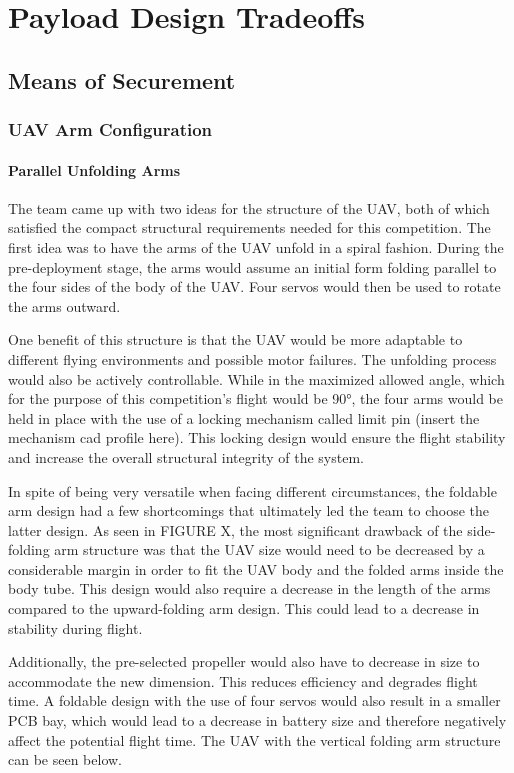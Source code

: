 \chapter{Payload Design Tradeoffs}

\section{Means of Securement}\label{PL:Tradeoffs:Securement}	
	\subsection{UAV Arm Configuration}
		\subsubsection{Parallel Unfolding Arms}
			The team came up with two ideas for the structure of the UAV, both of which satisfied the compact structural requirements needed for this competition. The first idea was to have the arms of the UAV unfold in a spiral fashion. During the pre-deployment stage, the arms would assume an initial form folding parallel to the four sides of the body of the UAV. Four servos would then be used to rotate the arms outward. 
		
			One benefit of this structure is that the UAV would be more adaptable to different flying environments and possible motor failures. The unfolding process would also be actively controllable. While in the maximized allowed angle, which for the purpose of this competition’s flight would be 90°, the four arms would be held in place with the use of a locking mechanism called limit pin (insert the mechanism cad profile here). This locking design would ensure the flight stability and increase the overall structural integrity of the system. 

			In spite of being very versatile when facing different circumstances, the foldable arm design had a few shortcomings that ultimately led the team to choose the latter design. As seen in FIGURE X, the most significant drawback of the side-folding arm structure was that the UAV size would need to be decreased by a considerable margin in order to fit the UAV body and the folded arms inside the body tube. This design would also require a decrease in the length of the arms compared to the upward-folding arm design. This could lead to a decrease in stability during flight. 
		
			Additionally, the pre-selected propeller would also have to decrease in size to accommodate the new dimension. This reduces efficiency and degrades flight time. A foldable design with the use of four servos would also result in a smaller PCB bay, which would lead to a decrease in battery size and therefore negatively affect the potential flight time. The UAV with the vertical folding arm structure can be seen below.
		


